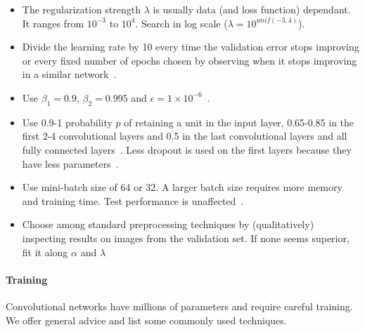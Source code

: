 \begin{itemize}
	\item The regularization strength $\lambda$ is usually data (and loss function) dependant. It ranges from $10^{-3}$ to $10^4$. Search in log scale ($\lambda = 10^{unif(-3, 4)}$).
	\item Divide the learning rate by 10 every time the validation error stops improving or every fixed number of epochs chosen by observing when it stops improving in a similar network~\cite{Krizhevsky2012, He2015b}.


	\item Use $\beta_1 = 0.9$, $\beta_2 = 0.995$ and $\epsilon = 1 {\times} 10^{-6}$~\cite{Karpathy2016}.

	\item Use 0.9-1 probability $p$ of retaining a unit in the input layer, 0.65-0.85 in the first 2-4 convolutional layers and 0.5 in the last convolutional layers and all fully connected layers~\cite{Srivastava2014}. Less dropout is used on the first layers because they have less parameters~\cite{Karpathy2016}.

	\item Use mini-batch size of 64 or 32. A larger batch size requires more memory and training time. Test performance is unaffected~\cite{Bengio2012}.

	\item Choose among standard preprocessing techniques by (qualitatively) inspecting results on images from the validation set. If none seems superior, fit it along $\alpha$ and $\lambda$%
\end{itemize}


\paragraph{Training} Convolutional networks have millions of parameters and require careful training. We offer general advice and list some commonly used techniques.


